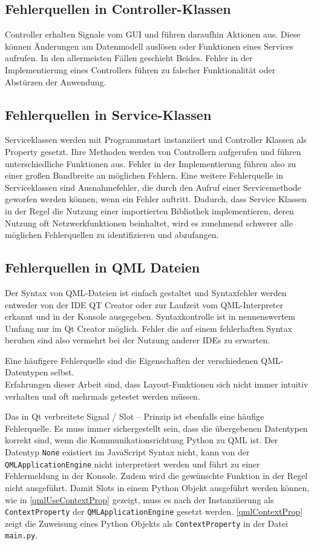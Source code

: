\subsection{Fehlerquellen in Controller-Klassen}

Controller erhalten Signale vom GUI und führen daraufhin Aktionen aus. 
Diese können Änderungen am Datenmodell auslösen oder Funktionen eines Services aufrufen. 
In den allermeisten Fällen geschieht Beides.
Fehler in der Implementierung eines Controllers führen zu falscher Funktionalität oder Abstürzen der Anwendung.

\subsection{Fehlerquellen in Service-Klassen}

Serviceklassen werden mit Programmstart instanziiert und Controller Klassen als Property gesetzt. 
Ihre Methoden werden von Controllern aufgerufen und führen unterschiedliche Funktionen aus. 
Fehler in der Implementierung führen also zu einer großen Bandbreite an möglichen Fehlern. 
Eine weitere Fehlerquelle in Serviceklassen sind Ausnahmefehler, die durch den Aufruf einer Servicemethode geworfen werden können, 
wenn ein Fehler auftritt. 
Dadurch, dass Service Klassen in der Regel die Nutzung einer importierten Bibliothek implementieren, deren Nutzung oft Netzwerkfunktionen beinhaltet,
wird es zunehmend schwerer alle möglichen Fehlerquellen zu identifizieren und abzufangen. 


\subsection{Fehlerquellen in QML Dateien}

Der Syntax von QML-Dateien ist einfach gestaltet und Syntaxfehler werden entweder von der IDE QT Creator oder zur Laufzeit vom QML-Interpreter
erkannt und in der Konsole ausgegeben. Syntaxkontrolle ist in nennenswertem Umfang nur im Qt Creator möglich. Fehler die auf einem 
fehlerhaften Syntax beruhen sind also vermehrt bei der Nutzung anderer IDEs zu erwarten. 

Eine häufigere Fehlerquelle sind die Eigenschaften der verschiedenen QML-Datentypen selbst. \\
Erfahrungen dieser Arbeit sind, dass Layout-Funktionen sich nicht immer intuitiv verhalten und oft mehrmals getestet werden müssen. 

Das in Qt verbreitete Signal / Slot – Prinzip ist ebenfalls eine häufige Fehlerquelle. 
Es muss immer sichergestellt sein, dass die übergebenen Datentypen korrekt sind, wenn die Kommunikationsrichtung 
Python zu QML ist. Der Datentyp \verb|None| existiert im JavaScript Syntax nicht, kann von der \verb|QMLApplicationEngine|
nicht interpretiert werden und führt zu einer Fehlermeldung in der Konsole. 
Zudem wird die gewünschte Funktion in der Regel nicht ausgeführt.
Damit Slots in einem Python Objekt ausgeführt werden können, wie in \ref{qmlUseContextProp} gezeigt, muss es nach der Instanziierung als \verb|ContextProperty| der 
\verb|QMLApplicationEngine| gesetzt werden.
\ref{qmlContextProp} zeigt die Zuweisung eines Python Objekts als \verb|ContextProperty| in der Datei \verb|main.py|.

